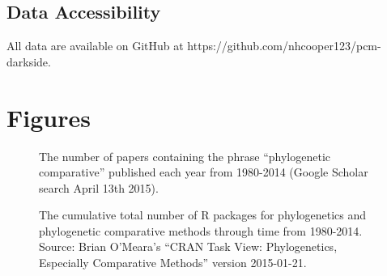 \documentclass[a4paper,12pt]{article}
\begin{document}
\subsection{Data Accessibility}
All data are available on GitHub at https://github.com/nhcooper123/pcm-darkside.




\newpage
\section{Figures}

  \begin{figure}[!htbp]
    \centering
      \caption{The number of papers containing the phrase ``phylogenetic comparative'' published each year from 1980-2014 (Google Scholar search April 13th 2015).}
      \label{PCMCitations}
  \end{figure}

\newpage
  \begin{figure}[!htbp]
    \centering
      \caption{The cumulative total number of R packages for phylogenetics and phylogenetic comparative methods through time from 1980-2014. Source: Brian O'Meara's ``CRAN Task View: Phylogenetics, Especially Comparative Methods'' version 2015-01-21.}
      \label{PCMRpackages}
  \end{figure}
\end{document}
